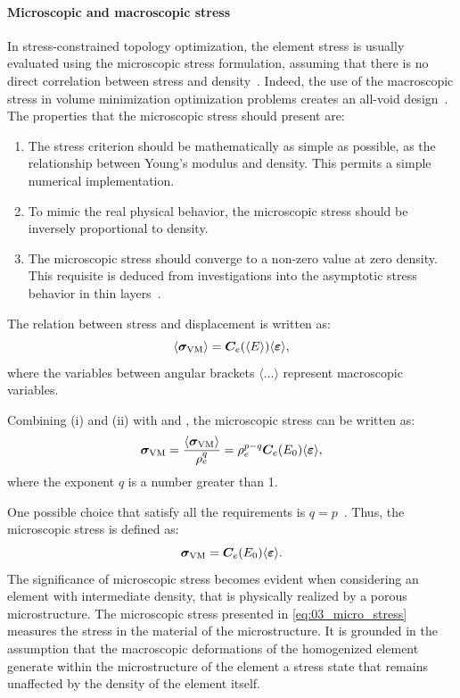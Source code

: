 \paragraph{Microscopic and macroscopic stress}
In stress-constrained topology optimization, the element stress is usually evaluated using the microscopic stress formulation, assuming that there is no direct correlation between stress and density~. Indeed, the use of the macroscopic stress in volume minimization optimization problems creates an all-void design~. The properties that the microscopic stress should present are:
\begin{enumerate}[label=(\roman*)]
    \item The stress criterion should be mathematically as simple as possible, as the relationship between Young's modulus and density. This permits a simple numerical implementation.
    \item To mimic the real physical behavior, the microscopic stress should be inversely proportional to density.
    \item The microscopic stress should converge to a non-zero value at zero density. This requisite is deduced from investigations into the asymptotic stress behavior in thin layers~.
\end{enumerate}

The relation between stress and displacement is written as:
\begin{equation}
    \langle \bm{\sigma}_{\text{VM}} \rangle = \bm{C}_e(\langle E \rangle) \langle \bm{\varepsilon} \rangle,
    \label{eq:03_stress_disp}
\end{equation}
where the variables between angular brackets $\langle \dots \rangle$ represent macroscopic variables.

Combining (i) and (ii) with  and , the microscopic stress can be written as:
\begin{equation}
    \bm{\sigma}_{\text{VM}} = \frac{\langle \bm{\sigma}_{\text{VM}} \rangle}{\rho^q_e} = \rho_e^{p-q} \bm{C}_e(E_0)\langle \bm{\varepsilon} \rangle,
\end{equation}
where the exponent $q$ is a number greater than 1.

One possible choice that satisfy all the requirements is $q=p$~. Thus, the microscopic stress is defined as:
\begin{equation}
    \bm{\sigma}_{\text{VM}} = \bm{C}_e(E_0)\langle \bm{\varepsilon} \rangle.
    \label{eq:03_micro_stress}
\end{equation}
The significance of microscopic stress becomes evident when considering an element with intermediate density, that is physically realized by a porous microstructure. The microscopic stress presented in \eqref{eq:03_micro_stress} measures the stress in the material of the microstructure. It is grounded in the assumption that the macroscopic deformations of the homogenized element generate within the microstructure of the element a stress state that remains unaffected by the density of the element itself.

